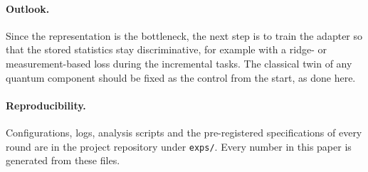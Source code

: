 \paragraph{Outlook.}
Since the representation is the bottleneck, the next step is to train the
adapter so that the stored statistics stay discriminative, for example with
a ridge- or measurement-based loss during the incremental tasks. The
classical twin of any quantum component should be fixed as the control from
the start, as done here.

\paragraph{Reproducibility.}
Configurations, logs, analysis scripts and the pre-registered specifications
of every round are in the project repository under \texttt{exps/}. Every
number in this paper is generated from these files.
